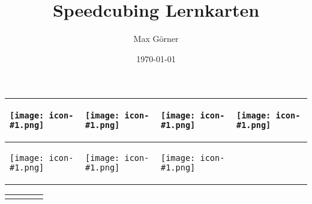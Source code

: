 \documentclass[12pt,a4paper,landscape]{scrartcl}
\title{Speedcubing Lernkarten}
\author{Max Görner}
\date{\today}
\newcounter{cardcounter}
\newlength{\cellheight}
\newlength{\cellwidth}
\newcommand{\cubeimg}[1] {
    \begin{minipage}[t][\cellheight][c]{\cellwidth}
        \begin{center}
            \texttt{[image: icon-\#1.png]}
        \end{center}
    \end{minipage}
}
\newcommand{\cubealgo}[1] {
    \begin{minipage}[t][\cellheight][c]{\cellwidth}
        \footnotesize
        \texttt{
            
        }
    \end{minipage}
}
\newcommand{\cvalue} {\ifnum\value{cardcounter}<10 0\fi\the\value{cardcounter}}
\newcommand{\cubeimgstep} {\cubeimg{\cvalue} \stepcounter{cardcounter}}
\newcommand{\cubealgostep} {\cubealgo{\cvalue} \addtocounter{cardcounter}{-1}}
\begin{document}
\setcounter{cardcounter}{11}
\begin{center}
    \begin{tabular}{|p{\cellwidth}|p{\cellwidth}|p{\cellwidth}|p{\cellwidth}|}
        \hline
        \cubeimgstep & \cubeimgstep & \cubeimgstep & \cubeimgstep \\\hline
        \cubeimgstep & \cubeimgstep & \cubeimgstep &  \\\hline
    \end{tabular}
\end{center}

\newpage

\begin{center}
    \begin{tabular}{|p{\cellwidth}|p{\cellwidth}|p{\cellwidth}|p{\cellwidth}|}
        \hline
        \setcounter{cardcounter}{11} \addtocounter{cardcounter}{3}
        \cubealgostep & \cubealgostep & \cubealgostep & \cubealgostep \\\hline
        \setcounter{cardcounter}{11} \addtocounter{cardcounter}{7}
        & \cubealgostep & \cubealgostep & \cubealgostep \\\hline
    \end{tabular}
\end{center}
\end{document}
